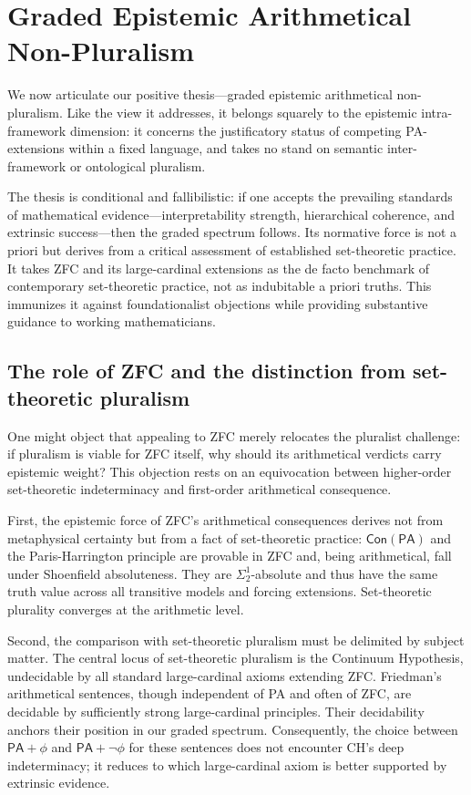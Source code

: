 \documentclass[a4paper,12pt]{amsart}
\theoremstyle{definition}
\numberwithin{equation}{section}
\begin{document}
\section{Graded Epistemic Arithmetical Non-Pluralism}\label{section7}
         
We now articulate our positive thesis---graded epistemic arithmetical 
non-pluralism. Like the view it addresses, it belongs squarely to the 
epistemic intra-framework dimension: it concerns the justificatory 
status of competing {\sf PA}-extensions within a fixed language, and takes no stand on semantic inter-framework or ontological pluralism.
 
The thesis is conditional and fallibilistic: if one accepts the 
prevailing standards of mathematical evidence---interpretability 
strength, hierarchical coherence, and extrinsic success---then the 
graded spectrum follows. Its normative force is not a priori but 
derives from a critical assessment of established set-theoretic 
practice. It takes {\sf ZFC} and its large-cardinal extensions as the 
de facto benchmark of contemporary set-theoretic practice, not as 
indubitable a priori truths. This immunizes it against foundationalist 
objections while providing substantive guidance to working 
mathematicians.
  
\subsection{The role of {\sf ZFC} and the distinction from set-theoretic pluralism}

One might object that appealing to {\sf ZFC} merely relocates the pluralist 
challenge: if pluralism is viable for {\sf ZFC} itself, why should its 
arithmetical verdicts carry epistemic weight? This objection rests on an equivocation between higher-order 
set-theoretic indeterminacy and first-order arithmetical consequence.

First, the epistemic force of ZFC's arithmetical consequences derives not from metaphysical certainty but from a fact of set-theoretic practice: $\mathsf{Con}(\mathsf{PA})$ and the Paris-Harrington principle are provable 
in {\sf ZFC} and, being arithmetical, fall under Shoenfield absoluteness. They are \(\Sigma_2^1\)-absolute and thus have the same truth value across all transitive models and forcing extensions. Set-theoretic plurality converges at the arithmetic level.


Second, the comparison with set-theoretic pluralism must be delimited by subject matter. The central locus of set-theoretic pluralism is the 
Continuum Hypothesis, undecidable by all standard large-cardinal axioms extending {\sf ZFC}. Friedman's arithmetical sentences, though independent of {\sf PA} and often of {\sf ZFC}, are decidable by sufficiently strong large-cardinal principles. Their decidability anchors their position in our graded spectrum.
 Consequently, the choice between $\mathsf{PA}+\phi$ and $\mathsf{PA}+\neg\phi$ for these sentences does not encounter {\sf CH}'s deep indeterminacy; it reduces to which large-cardinal axiom is better supported by extrinsic evidence.
\end{document}
